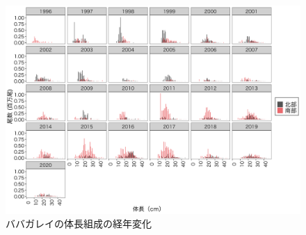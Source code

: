 \documentclass[11pt]{article} %
\begin{document}
\begin{linenumbers}
\begin{figure}[h]
  \centering
  \includegraphics[width = 14cm]{ババガレイlength.png}
  \caption{ババガレイの体長組成の経年変化}
\end{figure}

\end{linenumbers}
\end{document}

